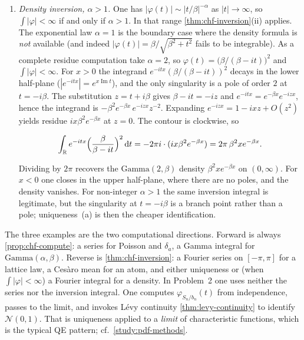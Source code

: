 \documentclass[11pt,a4paper]{article}
\begin{document}
\begin{example}
\begin{enumerate}[label=\textup{(\alph*)}]
    \item
    \emph{Density inversion, \(\alpha>1\).} One has \(|\varphi(t)|\sim |t/\beta|^{-\alpha}\) as \(|t|\to\infty\), so \(\int|\varphi|<\infty\) if and only if \(\alpha>1\). In that range \cref{thm:chf-inversion}(ii) applies. The exponential law \(\alpha=1\) is the boundary case where the density formula is \emph{not} available (and indeed \(|\varphi(t)|=\beta/\sqrt{\beta^{2}+t^{2}}\) fails to be integrable). As a complete residue computation take \(\alpha=2\), so \(\varphi(t)=\bigl(\beta/(\beta-it)\bigr)^{2}\) and \(\int|\varphi|<\infty\). For \(x>0\) the integrand \(e^{-itx}(\beta/(\beta-it))^{2}\) decays in the lower half-plane (\(|e^{-itx}|=e^{x\operatorname{Im} t}\)), and the only singularity is a pole of order \(2\) at \(t=-i\beta\). The substitution \(z=t+i\beta\) gives \(\beta-it=-iz\) and \(e^{-itx}=e^{-\beta x}e^{-izx}\), hence the integrand is \(-\beta^{2} e^{-\beta x}\,e^{-izx}z^{-2}\). Expanding \(e^{-izx}=1-ixz+O(z^{2})\) yields residue \(ix\beta^{2}e^{-\beta x}\) at \(z=0\). The contour is clockwise, so

\[
\int_{\mathbb{R}} e^{-itx}\Bigl(\frac{\beta}{\beta-it}\Bigr)^{2}\,\mathrm{d}t
=
-2\pi i\cdot(ix\beta^{2}e^{-\beta x})
=
2\pi\,\beta^{2} x e^{-\beta x}.
\]

Dividing by \(2\pi\) recovers the \(\mathrm{Gamma}(2,\beta)\) density \(\beta^{2} x e^{-\beta x}\) on \((0,\infty)\). For \(x<0\) one closes in the upper half-plane, where there are no poles, and the density vanishes. For non-integer \(\alpha>1\) the same inversion integral is legitimate, but the singularity at \(t=-i\beta\) is a branch point rather than a pole; uniqueness~(a) is then the cheaper identification.
\end{enumerate}
\end{example}

\begin{remark}
\label{rem:chf-exam}
The three examples are the two computational directions. Forward is always \cref{prop:chf-compute}: a series for Poisson and \(\delta_{a}\), a Gamma integral for \(\mathrm{Gamma}(\alpha,\beta)\). Reverse is \cref{thm:chf-inversion}: a Fourier series on \([-\pi,\pi]\) for a lattice law, a Ces\`aro mean for an atom, and either uniqueness or (when \(\int|\varphi|<\infty\)) a Fourier integral for a density. In Problem~2 one uses neither the series nor the inversion integral. One computes \(\varphi_{S_{n}/b_{n}}(t)\) from independence, passes to the limit, and invokes L\'evy continuity \cref{thm:levy-continuity} to identify \(\mathcal{N}(0,1)\). That is uniqueness applied to a \emph{limit} of characteristic functions, which is the typical QE pattern; cf.\ \cref{study:pdf-methods}.
\end{remark}
\end{document}
